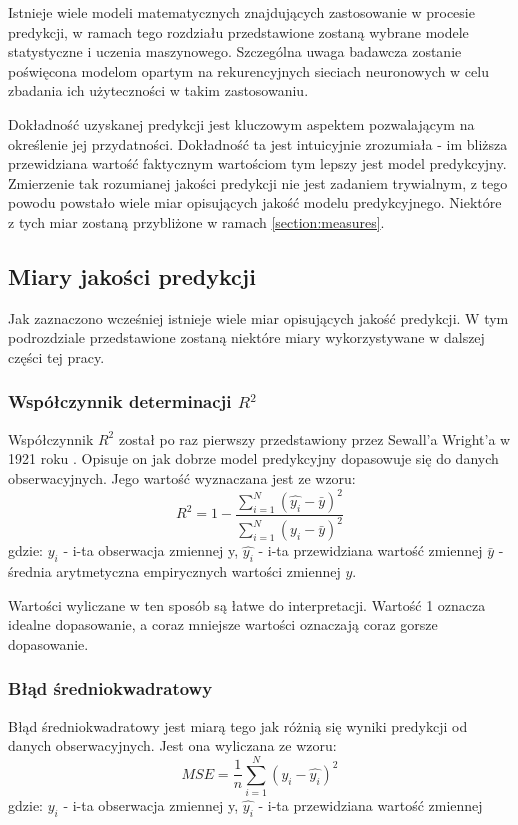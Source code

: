 \documentclass[10pt,a4paper]{article}
\begin{document}
Istnieje wiele modeli matematycznych znajdujących zastosowanie w procesie predykcji, w ramach tego rozdziału przedstawione zostaną wybrane modele statystyczne i uczenia maszynowego. Szczególna uwaga badawcza zostanie poświęcona modelom opartym na rekurencyjnych sieciach neuronowych w celu zbadania ich użyteczności w takim zastosowaniu.

Dokładność uzyskanej predykcji jest kluczowym aspektem pozwalającym na określenie jej przydatności. Dokładność ta jest intuicyjnie zrozumiała - im bliższa przewidziana wartość faktycznym wartościom tym lepszy jest model predykcyjny. Zmierzenie tak rozumianej jakości predykcji nie jest zadaniem trywialnym, z tego powodu powstało wiele miar opisujących jakość modelu predykcyjnego. Niektóre z tych miar zostaną przybliżone w ramach \autoref{section:measures}.

\subsection{Miary jakości predykcji}
\label{section:measures}
Jak zaznaczono wcześniej istnieje wiele miar opisujących jakość predykcji. W tym podrozdziale przedstawione zostaną niektóre miary wykorzystywane w dalszej części tej pracy. 
\subsubsection{Współczynnik determinacji $R^2$}
Współczynnik $R^2$ został po raz pierwszy przedstawiony przez Sewall'a Wright'a w 1921 roku \cite{ctx9250754850005154}. Opisuje on jak dobrze model predykcyjny dopasowuje się do danych obserwacyjnych. Jego wartość wyznaczana jest ze wzoru:
\begin{equation}
	R^2 = 1 - \frac{\sum_{i=1}^{N}(\hat{y_i} - \bar{y})^2}{\sum_{i=1}^{N}(y_i - \bar{y})^2} 
\end{equation}
gdzie:\newline
$y_i$ - i-ta obserwacja zmiennej y, \newline
$\hat{y_i}$ - i-ta przewidziana wartość zmiennej  \newline
$\bar{y}$ - średnia arytmetyczna empirycznych wartości zmiennej $y$.

Wartości wyliczane w ten sposób są łatwe do interpretacji. Wartość 1 oznacza idealne dopasowanie, a coraz mniejsze wartości oznaczają coraz gorsze dopasowanie. 
\subsubsection{Błąd średniokwadratowy}
Błąd średniokwadratowy jest miarą tego jak różnią się wyniki predykcji od danych obserwacyjnych. Jest ona wyliczana ze wzoru:
\begin{equation}
	MSE = \frac{1}{n}\sum_{i=1}^{N}(y_i - \hat{y_i})^2
	\label{equation:rmse}
\end{equation}
gdzie:\newline
$y_i$ - i-ta obserwacja zmiennej y, \newline
$\hat{y_i}$ - i-ta przewidziana wartość zmiennej  \newline
\end{document}
